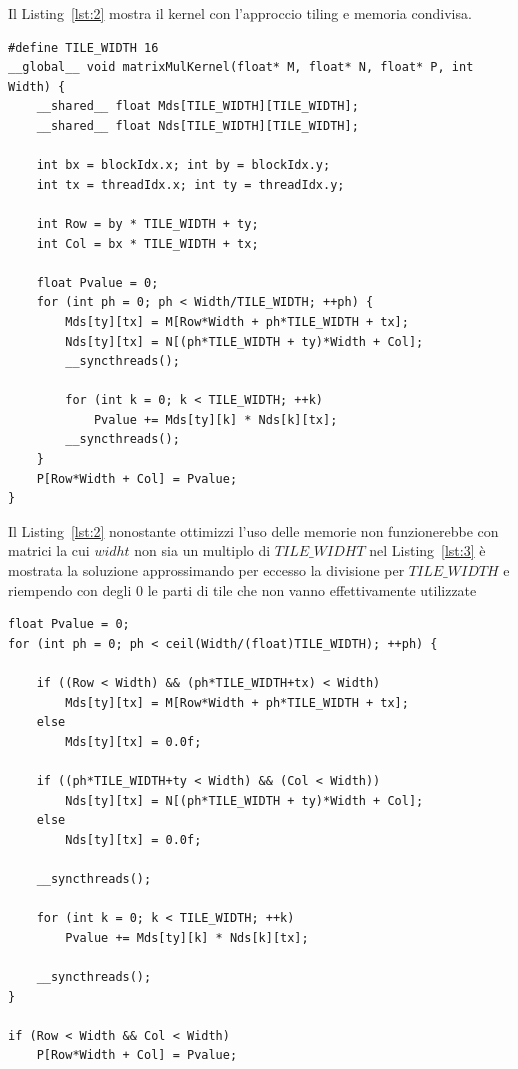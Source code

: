 \documentclass[a4paper]{article}
\begin{document}
Il Listing~\ref{lst:2} mostra il kernel con l'approccio tiling e memoria condivisa.

\begin{lstlisting}[caption={Kernel CUDA con tiling e memoria condivisa}, label={lst:2}]
#define TILE_WIDTH 16
__global__ void matrixMulKernel(float* M, float* N, float* P, int Width) {
    __shared__ float Mds[TILE_WIDTH][TILE_WIDTH];
    __shared__ float Nds[TILE_WIDTH][TILE_WIDTH];

    int bx = blockIdx.x; int by = blockIdx.y;
    int tx = threadIdx.x; int ty = threadIdx.y;

    int Row = by * TILE_WIDTH + ty;
    int Col = bx * TILE_WIDTH + tx;

    float Pvalue = 0;
    for (int ph = 0; ph < Width/TILE_WIDTH; ++ph) {
        Mds[ty][tx] = M[Row*Width + ph*TILE_WIDTH + tx];
        Nds[ty][tx] = N[(ph*TILE_WIDTH + ty)*Width + Col];
        __syncthreads();

        for (int k = 0; k < TILE_WIDTH; ++k)
            Pvalue += Mds[ty][k] * Nds[k][tx];
        __syncthreads();
    }
    P[Row*Width + Col] = Pvalue;
}
\end{lstlisting}

\newpage

Il Listing~\ref{lst:2} nonostante ottimizzi l'uso delle memorie non funzionerebbe con matrici la cui $widht$ non sia un multiplo di $TILE\_WIDHT$ nel Listing~\ref{lst:3} è mostrata la soluzione approssimando per eccesso la divisione per $TILE\_WIDTH$ e riempendo con degli $0$ le parti di tile che non vanno effettivamente utilizzate

\begin{lstlisting}[caption={Kernel CUDA con gestione dei bordi e tiling}, label={lst:3}]
float Pvalue = 0;
for (int ph = 0; ph < ceil(Width/(float)TILE_WIDTH); ++ph) {

    if ((Row < Width) && (ph*TILE_WIDTH+tx) < Width)
        Mds[ty][tx] = M[Row*Width + ph*TILE_WIDTH + tx];
    else
        Mds[ty][tx] = 0.0f;

    if ((ph*TILE_WIDTH+ty < Width) && (Col < Width))
        Nds[ty][tx] = N[(ph*TILE_WIDTH + ty)*Width + Col];
    else
        Nds[ty][tx] = 0.0f;

    __syncthreads();

    for (int k = 0; k < TILE_WIDTH; ++k)
        Pvalue += Mds[ty][k] * Nds[k][tx];

    __syncthreads();
}

if (Row < Width && Col < Width)
    P[Row*Width + Col] = Pvalue;
\end{lstlisting}
\end{document}
